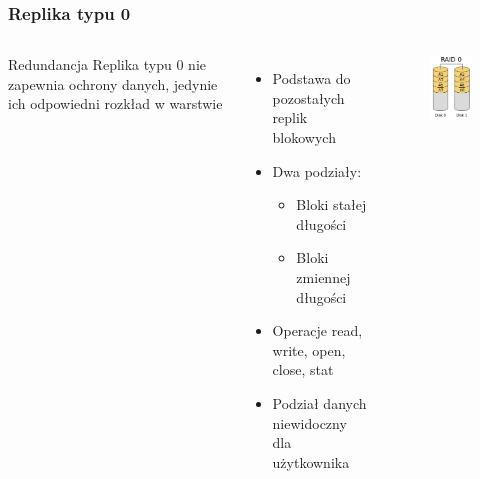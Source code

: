 \documentclass{beamer}
\begin{document}
\begin{frame}
	\frametitle{Replika typu 0}
		\begin{columns}
		\begin{block}{Redundancja}
			Replika typu 0 nie zapewnia ochrony danych, jedynie ich odpowiedni rozkład w warstwie
		\end{block}
		\begin{itemize}
			\item Podstawa do pozostałych replik blokowych
			\item Dwa podziały:
			\begin{itemize}
				\item Bloki stałej długości
				\item Bloki zmiennej długości
			\end{itemize}
			\item Operacje read, write, open, close, stat

			\item Podział danych niewidoczny dla użytkownika
		\end{itemize}
		\begin{figure}
			\includegraphics[scale=0.5]{raid-0.png}
		\end{figure}
		\end{columns}
\end{frame}
	
\end{document}
